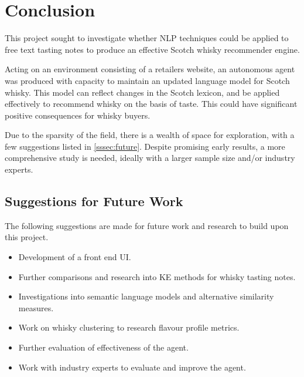 \section{Conclusion}\label{sec:conc}
This project sought to investigate whether NLP techniques could be applied to free text tasting notes 
to produce an effective Scotch whisky recommender engine.

Acting on an environment consisting of a retailers website, an autonomous
agent was produced with capacity to maintain an updated language model for Scotch whisky. This model
can reflect changes in the Scotch lexicon, and be applied effectively to recommend whisky on the basis of
taste. This could have significant positive consequences for whisky buyers.

Due to the sparsity of the field, there is a wealth of space for exploration, with a few suggestions listed
in \autoref{sssec:future}.  Despite promising early results, a more comprehensive study is needed, ideally
with a larger sample size and/or industry experts.

\subsection{Suggestions for Future Work}\label{sssec:future}

The following suggestions are made for future work and research to build upon this project.

\begin{itemize}
    \item Development of a front end UI.
    \item Further comparisons and research into KE methods for whisky tasting notes.
    \item Investigations into semantic language models and alternative similarity measures.
    \item Work on whisky clustering to research flavour profile metrics.
    \item Further evaluation of effectiveness of the agent.
    \item Work with industry experts to evaluate and improve the agent.
\end{itemize}